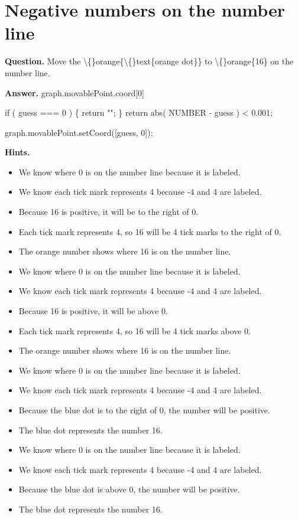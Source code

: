 \documentclass{article}
\begin{document}
\section*{Negative numbers on the number line}
\textbf{Question.} Move the \textbackslash\{\}orange\{\textbackslash\{\}text\{orange dot\}\} to
                    \textbackslash\{\}orange\{16\} on the number line.

\textbf{Answer.} graph.movablePoint.coord[0]
                
                    if ( guess === 0 ) \{
                        return "";
                    \}
                    return abs( NUMBER - guess ) < 0.001;
                
                
                    graph.movablePoint.setCoord([guess, 0]);

\textbf{Hints.}
\begin{itemize}
  \item We know where 0 is on the number line because it is labeled.
  \item We know each tick mark represents 4 because -4 and 4 are labeled.
  \item Because 16 is positive, it will be to the right of 0.
  \item Each tick mark represents 4,
                        so 16 will be
                        4 tick marks
                        to the right of 0.
  \item The orange number shows where 16 is on the number line.
  \item We know where 0 is on the number line because it is labeled.
  \item We know each tick mark represents 4 because -4 and 4 are labeled.
  \item Because 16 is positive, it will be above 0.
  \item Each tick mark represents 4,
                        so 16 will be
                        4 tick marks
                        above 0.
  \item The orange number shows where 16 is on the number line.
  \item We know where 0 is on the number line because it is labeled.
  \item We know each tick mark represents 4 because -4 and 4 are labeled.
  \item Because the blue dot is to the right of 0, the number will be positive.
  \item The blue dot represents the number 16.
  \item We know where 0 is on the number line because it is labeled.
  \item We know each tick mark represents 4 because -4 and 4 are labeled.
  \item Because the blue dot is above 0, the number will be positive.
  \item The blue dot represents the number 16.
\end{itemize}
\end{document}
